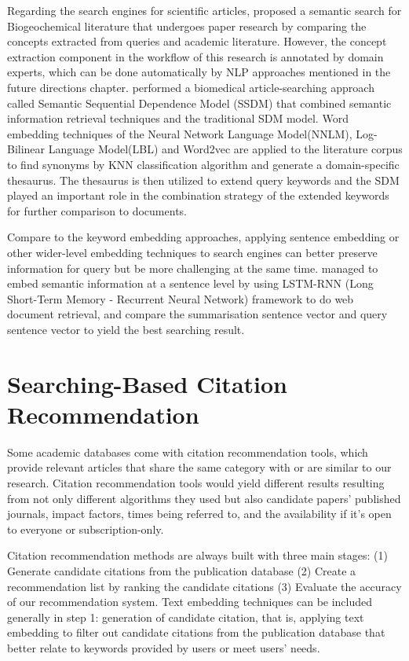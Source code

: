 Regarding the search engines for scientific articles, \cite{eisenberg2017} proposed a semantic search for Biogeochemical literature that undergoes paper research by comparing the concepts extracted from queries and academic literature.
However, the concept extraction component in the workflow of this research is annotated by domain experts, which can be done automatically by NLP approaches mentioned in the future directions chapter.
\cite{fang2018} performed a biomedical article-searching approach called Semantic Sequential Dependence Model (SSDM) that combined semantic information retrieval techniques and the traditional SDM model.
Word embedding techniques of the Neural Network Language Model(NNLM)\cite{bengio2000}, Log-Bilinear Language Model(LBL)\cite{mnih2007} and Word2vec are applied to the literature corpus to find synonyms by KNN classification algorithm and generate a domain-specific thesaurus.
The thesaurus is then utilized to extend query keywords and the SDM played an important role in the combination strategy of the extended keywords for further comparison to documents.

Compare to the keyword embedding approaches, applying sentence embedding or other wider-level embedding techniques to search engines can better preserve information for query but be more challenging at the same time.
\cite{palangi2016} managed to embed semantic information at a sentence level by using LSTM-RNN (Long Short-Term Memory - Recurrent Neural Network) framework to do web document retrieval, and compare the summarisation sentence vector and query sentence vector to yield the best searching result.


\section{Searching-Based Citation Recommendation}

Some academic databases come with citation recommendation tools, which provide relevant articles that share the same category with or are similar to our research.
Citation recommendation tools would yield different results resulting from not only different algorithms they used but also candidate papers' published journals, impact factors, times being referred to, and the availability if it's open to everyone or subscription-only.

Citation recommendation methods are always built with three main stages: (1) Generate candidate citations from the publication database (2) Create a recommendation list by ranking the candidate citations (3) Evaluate the accuracy of our recommendation system.\cite{ma2020}
Text embedding techniques can be included generally in step 1: generation of candidate citation, that is, applying text embedding to filter out candidate citations from the publication database that better relate to keywords provided by users or meet users' needs.

